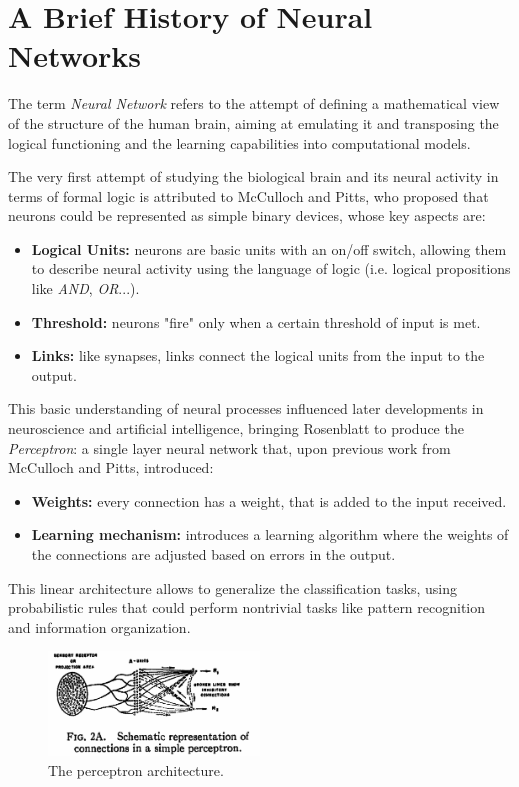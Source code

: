 \section{A Brief History of Neural Networks}
\label{sec:history-nn}

The term \textit{Neural Network} refers to the attempt of defining a mathematical view of the structure of the human brain, aiming at emulating it and transposing the logical functioning and the learning capabilities into computational models.

The very first attempt of studying the biological brain and its neural activity in terms of formal logic is attributed to McCulloch and Pitts, \cite{mcculloch1943logical} who proposed that neurons could be represented as simple binary devices, whose key aspects are:

\begin{itemize}
    \item \textbf{Logical Units:} neurons are basic units with an on/off switch, allowing them to describe neural activity using the language of logic (i.e. logical propositions like \textit{AND}, \textit{OR}...).
    \item \textbf{Threshold:} neurons "fire" only when a certain threshold of input is met.
    \item \textbf{Links:} like synapses, links connect the logical units from the input to the output.
\end{itemize}

This basic understanding of neural processes influenced later developments in neuroscience and artificial intelligence, bringing Rosenblatt to produce the \textit{Perceptron}: a single layer neural network that, upon previous work from McCulloch and Pitts, introduced:

\begin{itemize}
    \item \textbf{Weights:} every connection has a weight, that is added to the input received.
    \item \textbf{Learning mechanism:} introduces a learning algorithm where the weights of the connections are adjusted based on errors in the output.
\end{itemize}

This linear architecture allows to generalize the classification tasks, using probabilistic rules that could perform nontrivial tasks like pattern recognition and information organization.

\begin{figure}[ht]
    \centering
    \includegraphics[width=0.5\textwidth]{images/perceptron.png}
    \caption{The perceptron architecture.}
    \label{fig:perceptron}
\end{figure}

